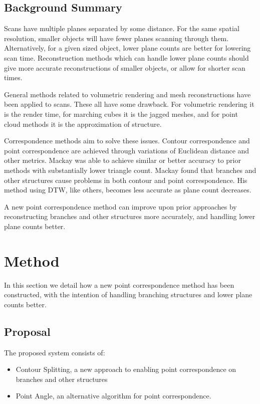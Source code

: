 \documentclass[11p, titlepage]{article}
\begin{document}
\subsection{Background Summary}

Scans have multiple planes separated by some distance. For the same spatial resolution, smaller objects will have fewer planes scanning through them. Alternatively, for a given sized object, lower plane counts are better for lowering scan time. Reconstruction methods which can handle lower plane counts should give more accurate reconstructions of smaller objects, or allow for shorter scan times.

General methods related to volumetric rendering and mesh reconstructions have been applied to scans. These all have some drawback. For volumetric rendering it is the render time, for marching cubes it is the jagged meshes, and for point cloud methods it is the approximation of structure.

Correspondence methods aim to solve these issues. Contour correspondence and point correspondence are achieved through variations of Euclidean distance and other metrics. Mackay was able to achieve similar or better accuracy to prior methods with substantially lower triangle count. Mackay found that branches and other structures cause problems in both contour and point correspondence. His method using DTW, like others, becomes less accurate as plane count decreases.

A new point correspondence method can improve upon prior approaches by reconstructing branches and other structures more accurately, and handling lower plane counts better.

\section{Method}

In this section we detail how a new point correspondence method has been constructed, with the intention of handling branching structures and lower plane counts better.

\subsection{Proposal}

The proposed system consists of:
\begin{itemize}
\item Contour Splitting, a new approach to enabling point correspondence on branches and other structures
\item Point Angle, an alternative algorithm for point correspondence.
\end{itemize}
\end{document}
